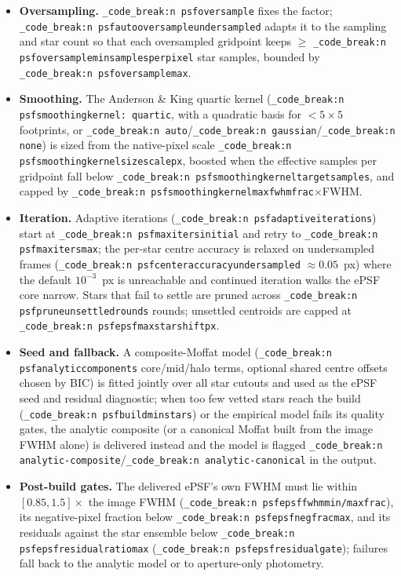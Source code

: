 \documentclass[11pt,a4paper]{article}
\renewcommand{\_}{\autophotunderscore\allowbreak}
\DeclareRobustCommand{\code}[1]{\texttt{\autophot_code_break:n {#1}}}
\begin{document}
\begin{itemize}[leftmargin=1.6em,itemsep=0.5pt]
\item \textbf{Oversampling.} \code{psf\_oversample} fixes the factor;
  \code{psf\_auto\_oversample\_undersampled} adapts it to the sampling
  and star count so that each oversampled gridpoint keeps
  $\ge$ \code{psf\_oversample\_min\_samples\_per\_pixel} star samples,
  bounded by \code{psf\_oversample\_max}.
\item \textbf{Smoothing.} The Anderson \& King quartic kernel
  (\code{psf\_smoothing\_kernel: quartic}, with a quadratic basis for
  $<5\times5$ footprints, or \code{auto}\slash\code{gaussian}\slash\code{none}) is
  sized from the native-pixel scale
  \code{psf\_smoothing\_kernel\_size\_scale\_px}, boosted when the
  effective samples per gridpoint fall below
  \code{psf\_smoothing\_kernel\_target\_samples}, and capped by
  \code{psf\_smoothing\_kernel\_max\_fwhm\_frac}$\times$FWHM.
\item \textbf{Iteration.} Adaptive iterations
  (\code{psf\_adaptive\_iterations}) start at
  \code{psf\_maxiters\_initial} and retry to \code{psf\_maxiters\_max};
  the per-star centre accuracy is relaxed on undersampled frames
  (\code{psf\_center\_accuracy\_undersampled} $\approx0.05$~px) where the
  default $10^{-3}$~px is unreachable and continued iteration walks the
  ePSF core narrow. Stars that fail to settle are pruned across
  \code{psf\_prune\_unsettled\_rounds} rounds; unsettled centroids are
  capped at \code{psf\_epsf\_max\_star\_shift\_px}.
\item \textbf{Seed and fallback.} A composite-Moffat model
  (\code{psf\_analytic\_components} core/mid/halo terms, optional shared
  centre offsets chosen by BIC) is fitted jointly over all star cutouts
  and used as the ePSF seed and residual diagnostic; when too few vetted
  stars reach the build (\code{psf\_build\_min\_stars}) or the empirical
  model fails its quality gates, the analytic composite (or a canonical
  Moffat built from the image FWHM alone) is delivered instead and the
  model is flagged \code{analytic-composite}\slash\code{analytic-canonical} in
  the output.
\item \textbf{Post-build gates.} The delivered ePSF's own FWHM must lie
  within $[0.85, 1.5]\times$ the image FWHM
  (\code{psf\_epsf\_fwhm\_min/max\_frac}), its negative-pixel fraction
  below \code{psf\_epsf\_negfrac\_max}, and its residuals against the
  star ensemble below \code{psf\_epsf\_residual\_ratio\_max}
  (\code{psf\_epsf\_residual\_gate}); failures fall back to the analytic
  model or to aperture-only photometry.
\end{itemize}
\end{document}
